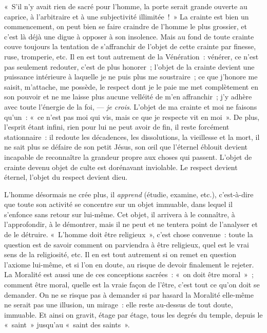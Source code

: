 \documentclass[french,twoside]{book} %
\begin{document}
« S’il n’y avait rien de sacré pour l’homme, la porte serait grande ouverte au caprice, à l’arbitraire et à une subjectivité illimitée ! » La crainte est bien un commencement, on peut bien se faire craindre de l’homme le plus grossier, et c’est là déjà une digue à opposer à son insolence. Mais au fond de toute crainte couve toujours la tentation de s’affranchir de l’objet de cette crainte par finesse, ruse, tromperie, etc. Il en est tout autrement de la Vénération : vénérer, ce n’est pas seulement redouter, c’est de plus honorer ; l’objet de la crainte devient une puissance intérieure à laquelle je ne puis plus me soustraire ; ce que j’honore me saisit, m’attache, me possède, le respect dont je le paie me met complètement en son pouvoir et ne me laisse plus aucune velléité de m’en affranchir ; j’y adhère avec toute l’énergie de la foi, — \emph{je crois}. L’objet de ma crainte et moi ne faisons qu’un : « ce n’est pas moi qui vis, mais ce que je respecte vit en moi ». De plus, l’esprit étant infini, rien pour lui ne peut avoir de fin, il reste forcément stationnaire : il redoute les décadences, les dissolutions, la vieillesse et la mort, il ne sait plus se défaire de son petit Jésus, son œil que l’éternel éblouit devient incapable de reconnaître la grandeur propre aux choses qui passent. L’objet de crainte devenu objet de culte est dorénavant inviolable. Le respect devient éternel, l’objet du respect devient dieu.\par
L’homme désormais ne crée plus, il \emph{apprend} (étudie,  examine, etc.), c’est-à-dire que toute son activité se concentre sur un objet immuable, dans lequel il s’enfonce sans retour sur lui-même. Cet objet, il arrivera à le connaître, à l’approfondir, à le démontrer, mais il ne peut et ne tentera point de l’analyser et de le détruire. « L’homme doit être religieux », c’est chose convenue : toute la question est de savoir comment on parviendra à être religieux, quel est le vrai sens de la religiosité, etc. Il en est tout autrement si on remet en question l’axiome lui-même, et si l’on en doute, au risque de devoir finalement le rejeter. La Moralité est aussi une de ces conceptions sacrées : « on doit être moral » ; comment être moral, quelle est la vraie façon de l’être, c’est tout ce qu’on doit se demander. On ne se risque pas à demander si par hasard la Moralité elle-même ne serait pas une illusion, un mirage : elle reste au-dessus de tout doute, immuable. Et ainsi on gravit, étage par étage, tous les degrés du temple, depuis le « saint » jusqu’au « saint des saints ».\par
\end{document}
